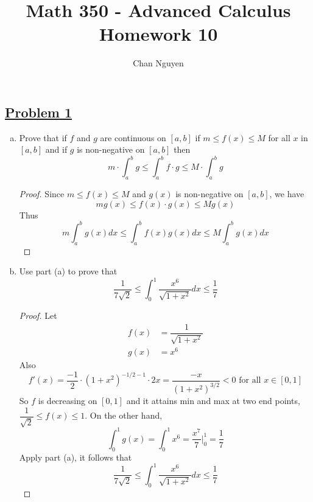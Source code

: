 \documentclass[10pt,letterpaper]{article}
\title{\textbf{Math 350 - Advanced Calculus \\ Homework 10}}
\author{Chan Nguyen}
\begin{document}
\tableofcontents 
\maketitle

\setlength{\parindent}{0pt}
\setlength{\parskip}{1ex}
	\subsection*{{\color{purple}\underline{Problem 1}}}
	\text{ } 
	\begin{enumerate}[(a)]
	\item Prove that if $f$ and $g$ are continuous on $[a, b]$ if $m \leq f(x) \leq M$ for all $x$ in $[a, b]$ and
	if $g$ is non-negative on $[a, b]$ then
	$$m \cdot \displaystyle\int_{a}^{b} g \leq \displaystyle\int_a^b f \cdot g \leq M \cdot \displaystyle\int_a^b g$$
\begin{proof}
	Since $m \leq f(x) \leq M$ and $g(x)$ is non-negative on $[a, b]$, we have
	$$mg(x) \leq f(x) \cdot g(x) \leq Mg(x)$$
	Thus
	$$m \int_{a}^{b} g(x) dx \leq \int_{a}^{b} f(x)g(x) dx \leq M \int_a^b g(x) dx$$
\end{proof}	
	
	
	\item Use part (a) to prove that
	$$\dfrac{1}{7\sqrt{2}} \leq \displaystyle\int_0^1 \dfrac{x^6}{\sqrt{1 + x^2}} dx \leq \dfrac{1}{7}$$
\begin{proof}
	Let
\begin{align*}
	f(x) &= \dfrac{1}{\sqrt{1 + x^2}} \\
	g(x) &= x^6
\end{align*} 
	Also 
	$$f'(x) = \dfrac{-1}{2} \cdot (1 + x^2)^{-1/2 - 1} \cdot 2x
	= \dfrac{-x}{(1 + x^2)^{3/2}} < 0 \text{ for all } x \in [0, 1]$$
	So $f$ is decreasing on $[0, 1]$ and it attains min and max at two end points, $\dfrac{1}{\sqrt{2}} \leq f(x) \leq 1$.
	On the other hand,
	$$\int_0^1 g(x) = \int_0^1 x^6 = \dfrac{x^7}{7} \bigg|_0^1 = \dfrac{1}{7}$$
	Apply part (a), it follows that
	$$\dfrac{1}{7\sqrt{2}} \leq \displaystyle\int_0^1 \dfrac{x^6}{\sqrt{1 + x^2}} dx \leq \dfrac{1}{7}$$


\end{proof}	
	
	\end{enumerate}
	
\end{document}
